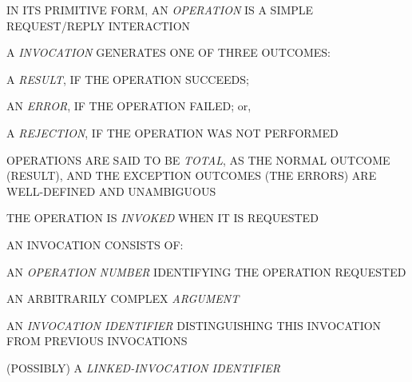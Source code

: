 \begin{bwslide}

\begin{nrtc}
\item   IN ITS PRIMITIVE FORM,
        AN \emph{OPERATION} IS A SIMPLE REQUEST/REPLY INTERACTION

\item   A \emph{INVOCATION} GENERATES ONE OF THREE OUTCOMES:
    \begin{nrtc}
    \item       A \emph{RESULT}, IF THE OPERATION SUCCEEDS;

    \item       AN \emph{ERROR}, IF THE OPERATION FAILED; or,

    \item       A \emph{REJECTION}, IF THE OPERATION WAS NOT PERFORMED
    \end{nrtc}

\item   OPERATIONS ARE SAID TO BE \emph{TOTAL}, AS THE NORMAL OUTCOME (RESULT),
        AND THE EXCEPTION OUTCOMES (THE ERRORS) ARE WELL-DEFINED AND
        UNAMBIGUOUS
\end{nrtc}
\end{bwslide}


\begin{bwslide}

\begin{nrtc}
\item   THE OPERATION IS \emph{INVOKED} WHEN IT IS REQUESTED

\item   AN INVOCATION CONSISTS OF:
    \begin{nrtc}
    \item       AN \emph{OPERATION NUMBER} IDENTIFYING THE OPERATION REQUESTED

    \item       AN ARBITRARILY COMPLEX \emph{ARGUMENT}

    \item       AN \emph{INVOCATION IDENTIFIER} DISTINGUISHING THIS INVOCATION
                FROM PREVIOUS INVOCATIONS

    \item       (POSSIBLY) A \emph{LINKED-INVOCATION IDENTIFIER}
    \end{nrtc}
\end{nrtc}
\end{bwslide}

